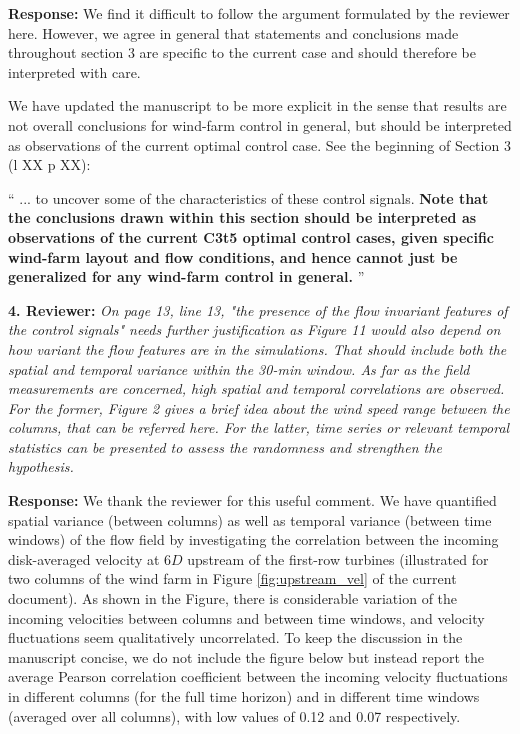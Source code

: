 \documentclass[]{article}
\begin{document}
\textbf{Response: } We find it difficult to follow the argument formulated by the reviewer here. However, we agree in general that statements and conclusions made throughout section 3 are specific to the current case and should therefore be interpreted with care. 

We have updated the manuscript to be more explicit in the sense that results are not overall conclusions for wind-farm control in general, but should be interpreted as observations of the current optimal control case. See the beginning of Section 3 (l XX p XX):

`` 
... to uncover some of the characteristics of these control signals. \textbf{Note that the conclusions drawn within this section should be interpreted as observations of the current C3t5 optimal control cases, given specific wind-farm layout and flow conditions, and hence cannot just be generalized for any wind-farm control in general.}
''


\dotfill

\textbf{4. Reviewer: } \textit{On page 13, line 13, "the presence of the flow invariant features of the control signals"
	needs further justification as Figure 11 would also depend on how variant the flow
	features are in the simulations. That should include both the spatial and temporal
	variance within the 30-min window. As far as the field measurements are concerned,
	high spatial and temporal correlations are observed. For the former, Figure 2 gives a
	brief idea about the wind speed range between the columns, that can be referred here.
	For the latter, time series or relevant temporal statistics can be presented to assess the
	randomness and strengthen the hypothesis.}

\textbf{Response: } We thank the reviewer for this useful comment. We have quantified spatial variance (between columns) as well as temporal variance (between time windows) of the flow field by investigating the correlation between the incoming disk-averaged velocity at 6$D$ upstream of the first-row turbines (illustrated for two columns of the wind farm in Figure \ref{fig:upstream_vel} of the current document). As shown in the Figure, there is considerable variation of the incoming velocities between columns and between time windows, and velocity fluctuations seem qualitatively uncorrelated. To keep the discussion in the manuscript concise, we do not include the figure below but instead report the average Pearson correlation coefficient between the incoming velocity fluctuations in different columns (for the full time horizon) and in different time windows (averaged over all columns), with low values of 0.12 and 0.07 respectively. 
\end{document}
